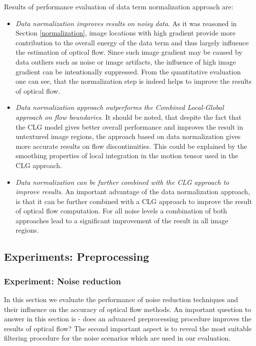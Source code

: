 Results of performance evaluation of data term normalization approach are:
\begin{itemize}
	\item \textit{Data normalization improves results on noisy data}. As it was reasoned in Section \ref{normalization}, image locations with high gradient provide more contribution to the overall energy of the data term and thus largely influence the estimation of optical flow. Since such image gradient may be caused by data outliers such as noise or image artifacts, the influence of high image gradient can be intentionally suppressed. From the quantitative evaluation one can see, that the normalization step is indeed helps to improve the results of optical flow.
	    
	\item \textit{Data normalization approach outperforms the Combined Local-Global approach on flow boundaries}. It should be noted, that despite the fact that the CLG model gives better overall performance and improves the result in untextured image regions, the approach based on data normalization gives more accurate results on flow discontinuities. This could be explained by the smoothing properties of local integration in the motion tensor used in the CLG approach.   
	
	\item \textit{Data normalization can be further combined with the CLG approach to improve results}. An important advantage of the data normalization approach, is that it can be further combined with a CLG approach to improve the result of optical flow computation. For all noise levels a combination of both approaches lead to a significant improvement of the result in all image regions.    
\end{itemize}


\subsection{Experiments: Preprocessing}

\subsubsection{Experiment: Noise reduction}
\label{experiment_noise_reduction}


In this section we evaluate the performance of noise reduction techniques and their influence on the accuracy of optical flow methods. An important question to answer in this section is - does an advanced preprocessing procedure improves the results of optical flow? The second important aspect is to reveal the most suitable filtering procedure for the noise scenarios which are used in our evaluation.

